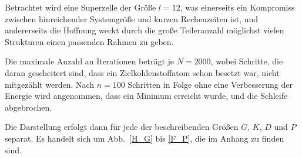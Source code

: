 \documentclass[a4paper, 10pt, twoside, openany]{book} %
\begin{document}
	Betrachtet wird eine Superzelle der Größe $l = 12$, was einerseits ein Kompromiss zwischen hinreichender Systemgröße und kurzen Rechenzeiten ist, und andererseits die Hoffnung weckt durch die große Teileranzahl möglichst vielen Strukturen einen passenden Rahmen zu geben.
	
	Die maximale Anzahl an Iterationen beträgt je $N = 2000$, wobei Schritte, die daran gescheitert sind, dass ein Zielkohlenstoffatom schon besetzt war, nicht mitgezählt werden. Nach $n = 100$ Schritten in Folge ohne eine Verbesserung der Energie wird angenommen, dass ein Minimum erreicht wurde, und die Schleife abgebrochen.
	
	Die Darstellung erfolgt dann für jede der beschreibenden Größen $G$, $K$, $D$ und $P$ separat. Es handelt sich um Abb.~\ref{H_G} bis \ref{F_P}, die im Anhang zu finden sind.
	
\end{document}
